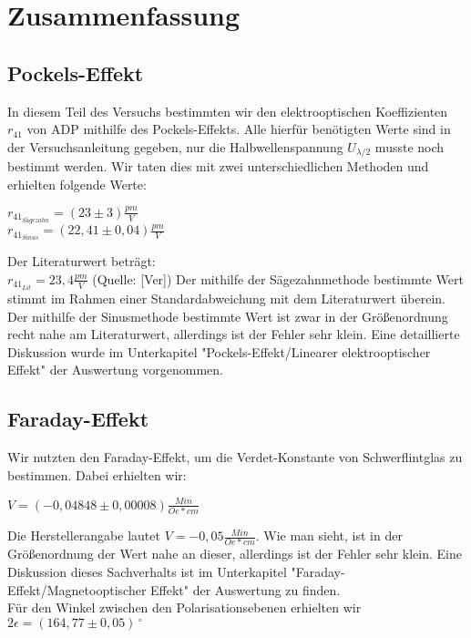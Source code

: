 \clearpage
\section{Zusammenfassung}
\subsection{Pockels-Effekt}
In diesem Teil des Versuchs bestimmten wir den elektrooptischen Koeffizienten $r_{41}$ von ADP mithilfe des Pockels-Effekts. Alle hierfür benötigten Werte sind in der Versuchsanleitung gegeben, nur die Halbwellenspannung $U_{\lambda/2}$ musste noch bestimmt werden. Wir taten dies mit zwei unterschiedlichen Methoden und erhielten folgende Werte:\\
\begin{center}
$r_{41_{Sägezahn}}=(23\pm3)\frac{pm}{V}$\\
$r_{41_{Sinus}}=(22,41\pm0,04)\frac{pm}{V}$\\
\end{center}
Der Literaturwert beträgt:\\
$r_{41_{Lit}}=23,4\frac{pm}{V}$ (Quelle: [Ver])
Der mithilfe der Sägezahnmethode bestimmte Wert stimmt im Rahmen einer Standardabweichung mit dem Literaturwert überein. Der mithilfe der Sinusmethode bestimmte Wert ist zwar in der Größenordnung recht nahe am Literaturwert, allerdings ist der Fehler sehr klein. Eine detaillierte Diskussion wurde im Unterkapitel "Pockels-Effekt/Linearer elektrooptischer Effekt" der Auswertung vorgenommen.\\
\subsection{Faraday-Effekt}
Wir nutzten den Faraday-Effekt, um die Verdet-Konstante von Schwerflintglas zu bestimmen. Dabei erhielten wir:\\
\begin{center}
$V=(-0,04848\pm0,00008)\frac{Min}{Oe*cm}$\\
\end{center}
Die Herstellerangabe lautet $V=-0,05 \frac{Min}{Oe*cm}$. Wie man sieht, ist in der Größenordnung der Wert nahe an dieser, allerdings ist der Fehler sehr klein. Eine Diskussion dieses Sachverhalts ist im Unterkapitel "Faraday-Effekt/Magnetooptischer Effekt" der Auswertung zu finden.\\
Für den Winkel zwischen den Polarisationsebenen erhielten wir $2\epsilon=(164,77\pm0,05)\,^\circ $